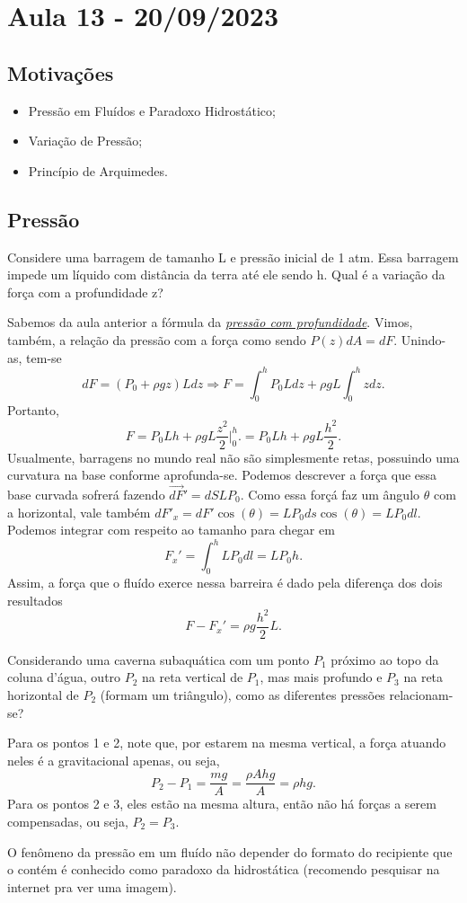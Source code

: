 \documentclass[physicsII_notes.tex]{subfiles}
\begin{document}
\section{Aula 13 - 20/09/2023}
\subsection{Motivações}
\begin{itemize}
	\item Pressão em Fluídos e Paradoxo Hidrostático;
	\item Variação de Pressão;
	\item Princípio de Arquimedes.
\end{itemize}
\subsection{Pressão}
\begin{example}
	Considere uma barragem de tamanho L e pressão inicial de 1 atm. Essa barragem impede um líquido com distância da terra até ele sendo h.
	Qual é a variação da força com a profundidade z?

	Sabemos da aula anterior a fórmula da \textit{\hyperlink{pressure_submerging}{pressão com profundidade}}. Vimos, também, a relação da pressão com a força
	como sendo \(P(z)dA = dF\). Unindo-as, tem-se
	\[
		dF = (P_{0}+\rho gz)Ldz \Rightarrow F = \int_{0}^{h}P_{0}Ldz + \rho gL \int_{0}^{h}z dz.
	\]
	Portanto,
	\[
		F = P_{0}Lh + \rho gL \frac{z^{2}}{2}\biggl|_{0}^{h}\biggr. = P_{0}Lh + \rho gL \frac{h^{2}}{2}.
	\]
	Usualmente, barragens no mundo real não são simplesmente retas, possuindo uma curvatura na base conforme aprofunda-se. Podemos descrever
	a força que essa base curvada sofrerá fazendo \(\vec{dF}' = dS L P_{0}\). Como essa forçá faz um ângulo \(\theta \) com a horizontal, vale também
	\(dF'_{x} = dF'\cos{(\theta )} = LP_{0}ds\cos{(\theta )} = LP_{0}dl.\) Podemos integrar com respeito ao tamanho para chegar em
	\[
		F_{x}' = \int_{0}^{h}LP_{0}dl = LP_{0}h.
	\]
	Assim, a força que o fluído exerce nessa barreira é dado pela diferença dos dois resultados
	\[
		F - F_{x}' = \rho g \frac{h^{2}}{2}L.
	\]
\end{example}
\begin{example}
	Considerando uma caverna subaquática com um ponto \(P_{1}\) próximo ao topo da coluna d'água,
	outro \(P_{2}\) na reta vertical de \(P_{1}\), mas mais profundo e \(P_{3}\) na reta horizontal de \(P_{2}\)
	(formam um triângulo), como as diferentes pressões relacionam-se?

	Para os pontos 1 e 2, note que, por estarem na mesma vertical, a força atuando neles é a gravitacional apenas, ou seja,
	\[
		P_{2} - P_{1} = \frac{mg}{A} = \frac{\rho Ahg}{A} = \rho hg.
	\]
	Para os pontos 2 e 3, eles estão na mesma altura, então não há forças a serem compensadas, ou seja, \(P_{2} = P_{3}\).
\end{example}
O fenômeno da pressão em um fluído não depender do formato do recipiente que o contém é conhecido como paradoxo da hidrostática (recomendo pesquisar na internet pra ver uma imagem).
\end{document}
